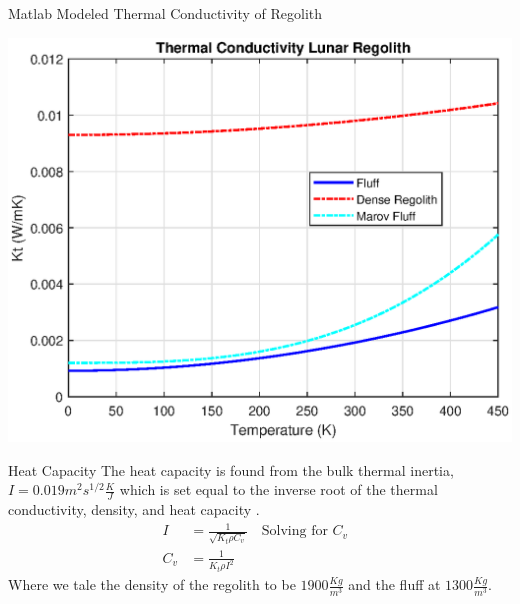 \documentclass{beamer}
\begin{document}
\begin{frame}{Matlab Modeled Thermal Conductivity of Regolith}
 \begin{center}
             \includegraphics[width=.9\textwidth]{thermal_conductivity.eps}   
      \end{center}  

\end{frame}

\begin{frame}{Heat Capacity}
The heat capacity is found from the bulk thermal inertia, $I = 0.019 m^2 s^{1/2} \frac{K}{J}$ which is set equal to the inverse root of the thermal conductivity, density, and heat capacity \cite{Racca}. 
\begin{align*}
I & = \frac{1}{\sqrt{K_t \rho C_v}} \quad \text{Solving for $C_v$	}\\
C_v & = \frac{1}{K_t \rho I^2}
\end{align*}
Where we tale the density of the regolith to be $ 1900 \frac{Kg}{m^3} $  and the fluff at $1300\frac{Kg}{m^3} $\cite{Malla}.
\end{frame}






%
% 
\end{document}
